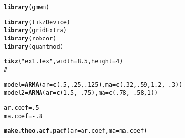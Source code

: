 \documentclass{article}\usepackage[]{graphicx}\usepackage[]{color}
\makeatletter
\newcommand{\hlnum}[1]{\textcolor[rgb]{0.686,0.059,0.569}{#1}}%
\newcommand{\hlstr}[1]{\textcolor[rgb]{0.192,0.494,0.8}{#1}}%
\newcommand{\hlcom}[1]{\textcolor[rgb]{0.678,0.584,0.686}{\textit{#1}}}%
\newcommand{\hlopt}[1]{\textcolor[rgb]{0,0,0}{#1}}%
\newcommand{\hlstd}[1]{\textcolor[rgb]{0.345,0.345,0.345}{#1}}%
\newcommand{\hlkwb}[1]{\textcolor[rgb]{0.69,0.353,0.396}{#1}}%
\newcommand{\hlkwc}[1]{\textcolor[rgb]{0.333,0.667,0.333}{#1}}%
\newcommand{\hlkwd}[1]{\textcolor[rgb]{0.737,0.353,0.396}{\textbf{#1}}}%
\newenvironment{kframe}{%
 \def\at@end@of@kframe{}%
 \ifinner\ifhmode%
  \def\at@end@of@kframe{\end{minipage}}%
  \begin{minipage}{\columnwidth}%
 \fi\fi%
 \def\FrameCommand##1{\hskip\@totalleftmargin \hskip-\fboxsep
 \colorbox{shadecolor}{##1}\hskip-\fboxsep
     \hskip-\linewidth \hskip-\@totalleftmargin \hskip\columnwidth}%
 \MakeFramed {\advance\hsize-\width
   \@totalleftmargin\z@ \linewidth\hsize
   \@setminipage}}%
 {\par\unskip\endMakeFramed%
 \at@end@of@kframe}
\newenvironment{knitrout}{}{} %
\makeatother
\begin{document}
\begin{knitrout}
\color{fgcolor}\begin{kframe}
\begin{alltt}
\hlkwd{library}\hlstd{(gmwm)}
\end{alltt}


{\ttfamily\noindent\itshape\color{messagecolor}{\#\# Loading required package: ggplot2}}\begin{alltt}
\hlkwd{library}\hlstd{(tikzDevice)}
\hlkwd{library}\hlstd{(gridExtra)}
\hlkwd{library}\hlstd{(robcor)}
\hlkwd{library}\hlstd{(quantmod)}
\end{alltt}


{\ttfamily\noindent\itshape\color{messagecolor}{\#\# Loading required package: xts}}

{\ttfamily\noindent\itshape\color{messagecolor}{\#\# Loading required package: zoo}}

{\ttfamily\noindent\itshape\color{messagecolor}{\#\# \\\#\# Attaching package: 'zoo'}}

{\ttfamily\noindent\itshape\color{messagecolor}{\#\# The following objects are masked from 'package:base':\\\#\# \\\#\#\ \ \ \  as.Date, as.Date.numeric}}

{\ttfamily\noindent\itshape\color{messagecolor}{\#\# Loading required package: TTR}}

{\ttfamily\noindent\itshape\color{messagecolor}{\#\# Version 0.4-0 included new data defaults. See ?getSymbols.}}\begin{alltt}
\hlkwd{tikz}\hlstd{(}\hlstr{"ex1.tex"}\hlstd{,} \hlkwc{width} \hlstd{=} \hlnum{8.5}\hlstd{,} \hlkwc{height} \hlstd{=} \hlnum{4}\hlstd{)}
\hlcom{#}

\hlstd{model} \hlkwb{=} \hlkwd{ARMA}\hlstd{(}\hlkwc{ar} \hlstd{=} \hlkwd{c}\hlstd{(}\hlnum{.5}\hlstd{,} \hlnum{.25}\hlstd{,} \hlnum{.125}\hlstd{) ,}\hlkwc{ma} \hlstd{=} \hlkwd{c}\hlstd{(}\hlnum{.32}\hlstd{,}\hlnum{.59}\hlstd{,}\hlnum{1.2}\hlstd{,}\hlopt{-}\hlnum{.3}\hlstd{))}
\hlstd{model2} \hlkwb{=} \hlkwd{ARMA}\hlstd{(}\hlkwc{ar} \hlstd{=} \hlkwd{c}\hlstd{(}\hlnum{1.5}\hlstd{,} \hlopt{-}\hlnum{.75}\hlstd{) ,}\hlkwc{ma} \hlstd{=} \hlkwd{c}\hlstd{(}\hlnum{.78}\hlstd{,}\hlopt{-}\hlnum{.58}\hlstd{,}\hlnum{1}\hlstd{))}

\hlstd{ar.coef} \hlkwb{=} \hlnum{.5}
\hlstd{ma.coef} \hlkwb{=} \hlopt{-}\hlnum{.8}

\hlkwd{make.theo.acf.pacf}\hlstd{(}\hlkwc{ar} \hlstd{= ar.coef,} \hlkwc{ma} \hlstd{= ma.coef)}
\end{alltt}



\end{kframe}
\end{knitrout}
\end{document}
